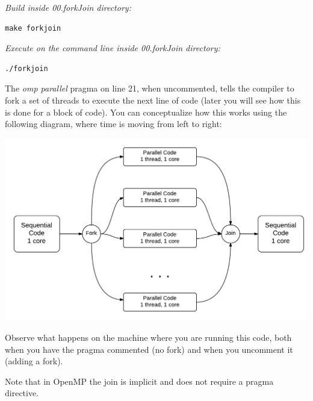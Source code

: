 \documentclass[letterpaper,10pt,openany,oneside]{sphinxmanual}
\begin{document}
\emph{Build inside 00.forkJoin directory:}

\begin{Verbatim}[commandchars=\\\{\}]
make forkjoin
\end{Verbatim}

\emph{Execute on the command line inside 00.forkJoin directory:}

\begin{Verbatim}[commandchars=\\\{\}]
./forkjoin
\end{Verbatim}

The \emph{omp parallel} pragma on line 21, when uncommented, tells the compiler to
fork a set of threads to execute the next line of code (later you will see how this is done for a block of code).  You can conceptualize how this works using the following diagram, where time is moving from left to right:

\includegraphics{ForkJoin.png}

Observe what happens on the machine
where you are running this code, both when you have the pragma commented (no fork) and when you uncomment it (adding a fork).

Note that in OpenMP the join is implicit and does not require a pragma directive.
\end{document}
